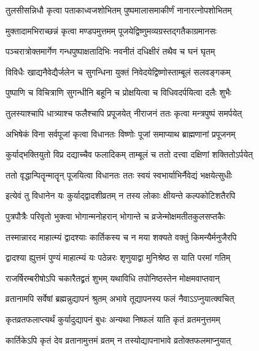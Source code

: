 \twolineshloka
{तुलसीसन्निधौ कृत्वा पताकाध्वजशोभितम्}
{पुष्पमालासमाकीर्णं नानारत्नोपशोभितम्} %

\twolineshloka
{मुक्तादामभिराच्छन्नं कृत्वा मण्डपमुत्तमम्}
{पूजयेद्विष्णुमव्यग्रस्तद्गतैकाग्रमानसः} %

\twolineshloka
{पञ्चरात्रोक्तमार्गेण गन्धपुष्पाक्षतादिभिः}
{नवनीतं दधिक्षीरं तथैव च घनं घृतम्} %

\twolineshloka
{विविधैः खाद्यनैवेद्यैर्जलेन च सुगन्धिना}
{युक्तं निवेदयेद्विष्णोस्ताम्बूलं सलवङ्गकम्} %

\twolineshloka
{पुष्पाणि च विचित्राणि सुगन्धीनि बहूनि च}
{प्रोक्षयित्वा च विधिवदर्पयित्वा दलैः शुभैः} %

\twolineshloka
{तुलस्याश्चापि धात्र्याश्च फलैश्चापि प्रपूजयेत्}
{नीराजनं ततः कृत्वा मन्त्रपुष्पं समर्पयेत्} %

\twolineshloka
{अभिषेकं विना सर्वपूजां कृत्वा विधानतः}
{विष्णोः पूजां समाप्याथ ब्राह्मणानां प्रपूजनम्} %

\twolineshloka
{कुर्याद्भक्तियुतो विप्र दद्याच्चैव फलादिकम्}
{ताम्बूलं च ततो दत्त्वा दक्षिणां शक्तितोऽर्पयेत्} %

\twolineshloka
{ततो वृद्धान्पितॄन्मातॄन् पूजयित्वा विधानतः}
{ततः स्वयं स्वभार्याभिर्नैवेद्यं भक्षयेत्सुधीः} %

\twolineshloka
{इत्येवं तु विधानेन यः कुर्याद्द्वादशीव्रतम्}
{न तस्य लोकाः क्षीयन्ते कल्पकोटिशतैरपि} %

\twolineshloka
{पुत्रपौत्रैः परिवृतो भुक्त्वा भोगान्मनोहरान्}
{भोगान्ते च व्रजेन्मोक्षमतीतकुलसप्तकैः} %

\twolineshloka
{तस्मान्नारद माहात्म्यं द्वादश्याः कार्तिकस्य च}
{न मया शक्यते वक्तुं किमन्यैर्मनुजैरपि} %

\twolineshloka
{द्वादश्या ह्युत्तमं पुण्यं माहात्म्यं यः पठेन्नरः}
{शृणुयाद्वा मुनिश्रेष्ठ स याति परमां गतिम्} %

\twolineshloka
{राजर्षिरम्बरीषोऽपि चकारैतद्व्रतं शुभम्}
{यथाविधि तपोनिष्ठस्तेन मोक्षमवाप्तवान्} %





\twolineshloka
{व्रतानामपि सर्वेषां ब्रह्मन्नुद्यापनं श्रुतम्}
{अभावे तूद्यापनस्य फलं नैवाऽऽप्नुयात्क्वचित्} %

\twolineshloka
{कृतव्रतफलाप्त्यर्थं कुर्यादुद्यापनं बुधः}
{अन्यथा निष्फलं याति कृतं व्रतमनुत्तमम्} %

\twolineshloka
{कार्तिकेऽपि कृतं देव व्रतानामुत्तमं व्रतम्}
{न तस्योद्यापनाभावे व्रतोक्तफलमाप्नुयात्} %

